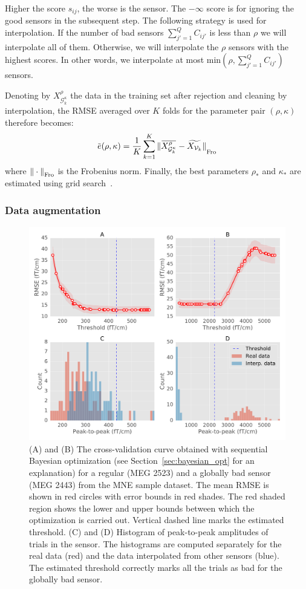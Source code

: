 Higher the score $s_{ij}$, the worse is the sensor. The $-\infty$ score is for ignoring the good sensors in the subsequent step. The following strategy is used for interpolation.
%
%
If the number of bad sensors $\sum_{j'=1}^{Q} C_{ij'}$ is less than $\rho$ we will interpolate all of them. Otherwise, we will interpolate the $\rho$ sensors with the highest scores.
In other words, we interpolate at most $\mathrm{min}(\rho, \sum_{j'=1}^{Q} C_{ij'})$ sensors.
%
%
%
%
%
%
%
%
%
%
%

Denoting by $X^{\rho}_{\mathcal{G}^{\kappa}_k}$ the data in the training set after rejection and cleaning by interpolation, the RMSE averaged over $K$ folds for the parameter pair $(\rho, \kappa)$ therefore becomes:
%
\begin{equation}
\overbar{e}(\rho, \kappa) = \frac{1}{K} \sum_{k=1}^{K} \fro{\overbar{X^{\rho}_{\mathcal{G}^{\kappa}_k}} - \widetilde{X_{\mathcal{V}_k}}}
\end{equation}
where ${\| \cdot \|}_{\mathrm{Fro}}$ is the Frobenius norm.
Finally, the best parameters $\rho_{*}$ and $\kappa_{*}$ are estimated using grid search~\citep{hsu2003practical}.
%

\subsubsection{Data augmentation}
\label{sec:data_augmentation}

\begin{figure}[ht!]
    \centering
    \includegraphics[width=0.8\linewidth]{figures/figure2.pdf}
    \caption[Sequential Bayesian optimization cross-validation curves]{(A) and (B) The cross-validation curve obtained with sequential Bayesian optimization (see Section~\ref{sec:bayesian_opt} for an explanation) for a regular (MEG 2523) and a globally bad sensor (MEG 2443) from the MNE sample dataset. The mean \ac{RMSE} is shown in red circles with error bounds in red shades. The red shaded region shows the lower and upper bounds between which the optimization is carried out. Vertical dashed line marks the estimated threshold. (C) and (D) Histogram of peak-to-peak amplitudes of trials in the sensor. The histograms are computed separately for the real data (red) and the data interpolated from other sensors (blue). The estimated threshold correctly marks all the trials as bad for the globally bad sensor.}
    \label{fig:cross_val_hist}
\end{figure}

